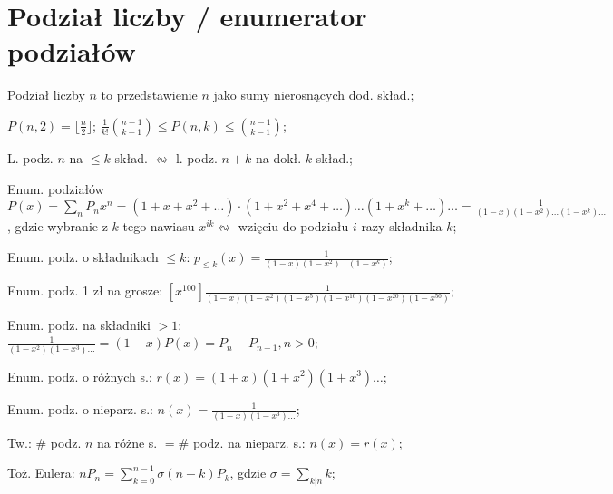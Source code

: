 \section{Podział liczby / enumerator podziałów}

Podział liczby $n$ to przedstawienie $n$ jako sumy nierosnących dod. skład.;

$P(n, 2) = \lfloor\frac{n}{2}\rfloor$;
$\frac{1}{k!}\binom{n-1}{k-1} \leq P(n,k) \leq \binom{n-1}{k-1}$;

L. podz. $n$ na $\leq k$ skład. $\leftrightsquigarrow$
  l. podz. $n+k$ na dokł. $k$ skład.;

Enum. podziałów $P(x) = \sum_nP_nx^n =
  (1+x+x^2+\dots)\cdot(1+x^2+x^4+\dots)\dots(1+x^k+\dots)\dots =
  \frac{1}{(1-x)(1-x^2)\dots(1-x^k)\dots}$, gdzie wybranie z $k$-tego nawiasu
  $x^{ik} \leftrightsquigarrow$ wzięciu do podziału $i$ razy składnika $k$;

Enum. podz. o składnikach $\leq k$: $p_{\leq k} (x) =
  \frac{1}{(1-x)(1-x^2)\dots(1-x^k)}$;

Enum. podz. 1 zł na grosze:
  $\left [ x^{100} \right ]
  \frac{1}{(1-x)(1-x^2)(1-x^5)(1-x^{10})(1-x^{20})(1-x^{50})}$;

Enum. podz. na składniki $>1$: $\frac{1}{(1-x^2)(1-x^3)\dots}=(1-x)P(x) =
  P_n - P_{n-1}, n>0$;

Enum. podz. o różnych s.: $r(x) = (1+x)(1+x^2)(1+x^3)\dots$;

Enum. podz. o nieparz. s.: $n(x)=\frac{1}{(1-x)(1-x^3)\dots}$;

Tw.: $\#$ podz. $n$ na różne s. $= \#$ podz. na nieparz. s.: $n(x) = r(x)$;

Toż. Eulera: $nP_n = \sum_{k=0}^{n-1}\sigma(n-k)P_k$,
  gdzie $\sigma = \sum_{k|n}k$;

